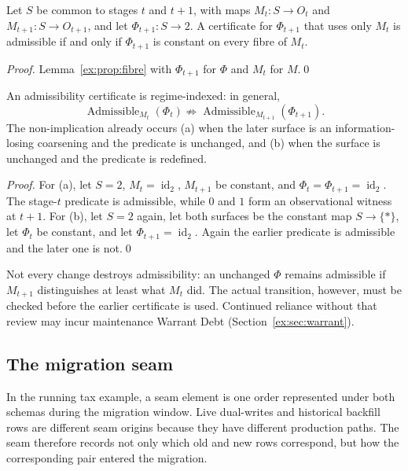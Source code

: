 \documentclass[smallextended,envcountsect,envcountsame,natbib]{svjour3}
\begin{document}
\begin{corollary}\label{ex:cor:dynfibre}
Let $S$ be common to stages $t$ and $t+1$, with maps $M_t:S\to O_t$ and $M_{t+1}:S\to O_{t+1}$, and let $\Phi_{t+1}:S\to 2$. A certificate for $\Phi_{t+1}$ that uses only $M_t$ is admissible if and only if $\Phi_{t+1}$ is constant on every fibre of $M_t$.
\end{corollary}

\begin{proof}
Lemma~\ref{ex:prop:fibre} with $\Phi_{t+1}$ for $\Phi$ and $M_t$ for $M$.\qed
\end{proof}

\begin{proposition}\label{ex:prop:certificate-expiry}
An admissibility certificate is regime-indexed: in general,
\[
\operatorname{Admissible}_{M_t}(\Phi_t)
\not\Longrightarrow
\operatorname{Admissible}_{M_{t+1}}(\Phi_{t+1}).
\]
The non-implication already occurs (a) when the later surface is an information-losing coarsening and the predicate is unchanged, and (b) when the surface is unchanged and the predicate is redefined.
\end{proposition}

\begin{proof}
For (a), let $S=2$, $M_t=\operatorname{id}_2$, $M_{t+1}$ be constant, and $\Phi_t=\Phi_{t+1}=\operatorname{id}_2$. The stage-$t$ predicate is admissible, while $0$ and $1$ form an observational witness at $t+1$. For (b), let $S=2$ again, let both surfaces be the constant map $S\to\{*\}$, let $\Phi_t$ be constant, and let $\Phi_{t+1}=\operatorname{id}_2$. Again the earlier predicate is admissible and the later one is not.\qed
\end{proof}

Not every change destroys admissibility: an unchanged $\Phi$ remains admissible if $M_{t+1}$ distinguishes at least what $M_t$ did. The actual transition, however, must be checked before the earlier certificate is used. Continued reliance without that review may incur maintenance Warrant Debt (Section~\ref{ex:sec:warrant}).

\subsection{The migration seam}\label{ex:sec:migration-seam}

In the running tax example, a seam element is one order represented under both schemas during the migration window. Live dual-writes and historical backfill rows are different seam origins because they have different production paths. The seam therefore records not only which old and new rows correspond, but how the corresponding pair entered the migration.
\end{document}
